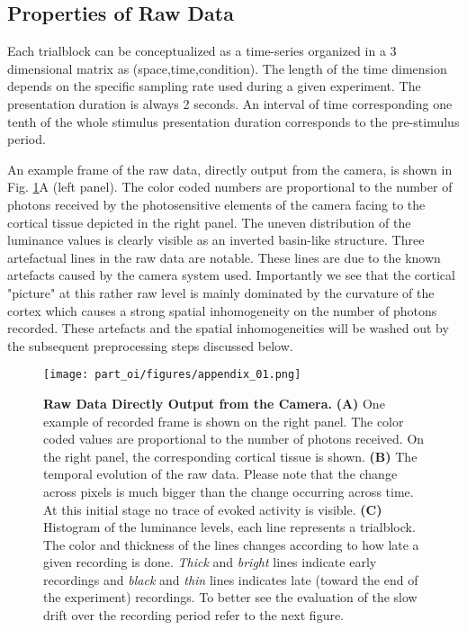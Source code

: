 \subsection{Properties of Raw Data}

Each trialblock can be conceptualized as a time-series organized in a 3
dimensional matrix as (space,time,condition). The length of the time
dimension depends on the specific sampling rate used during a given
experiment. The presentation duration is always 2 seconds. An interval of
time corresponding one tenth of the whole stimulus presentation duration
corresponds to the pre-stimulus period.

An example frame of the raw data, directly output from the camera, is shown
in Fig. \ref{oi_app01}A (left panel). The color coded numbers are
proportional to the number of photons received by the photosensitive
elements of the camera facing to the cortical tissue depicted in the right
panel. The uneven distribution of the luminance values is clearly visible
as an inverted basin-like structure. Three artefactual lines in the raw
data are notable. These lines are due to the known artefacts caused by the
camera system used. Importantly we see that the cortical "picture" at this
rather raw level is mainly dominated by the curvature of the cortex which
causes a strong spatial inhomogeneity on the number of photons recorded.
These artefacts and the spatial inhomogeneities will be washed out by the
subsequent preprocessing steps discussed below.

\begin{figure}[!h] 
\texttt{[image: part\_oi/figures/appendix\_01.png]}
\caption[Raw Data Directly Output from the Camera.]{\textbf{Raw Data
Directly Output from the Camera.} \textbf{(A)} One example of recorded
frame is shown on the right panel. The color coded values are proportional
to the number of photons received. On the right panel, the corresponding
cortical tissue is shown. \textbf{(B)} The temporal evolution of the raw
data. Please note that the change across pixels is much bigger than the
change occurring across time. At this initial stage no trace of evoked
activity is visible. \textbf{(C)} Histogram of the luminance levels, each
line represents a trialblock. The color and thickness of the lines changes
according to how late a given recording is done. \textit{Thick} and
\textit{bright} lines indicate early recordings and \textit{black} and
\textit{thin} lines indicates late (toward the end of the experiment)
recordings. To better see the evaluation of the slow drift over the
recording period refer to the next figure.} \label{oi_app01}\end{figure}

